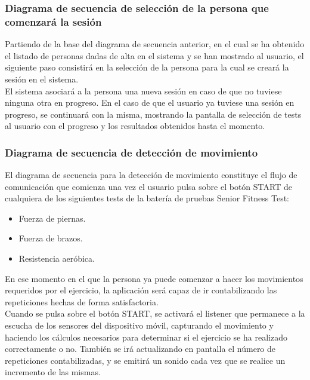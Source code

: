 \subsubsection{Diagrama de secuencia de selección de la persona que comenzará la sesión}

Partiendo de la base del diagrama de secuencia anterior, en el cual se ha obtenido el listado de personas dadas de alta en el sistema y se han mostrado al usuario, el siguiente paso consistirá en la selección de la persona para la cual se creará la sesión en el sistema.\\

El sistema asociará a la persona una nueva sesión en caso de que no tuviese ninguna otra en progreso. En el caso de que el usuario ya tuviese una sesión en progreso, se continuará con la misma, mostrando la pantalla de selección de tests al usuario con el progreso y los resultados obtenidos hasta el momento.\\


\subsubsection{Diagrama de secuencia de detección de movimiento}

El diagrama de secuencia para la detección de movimiento constituye el flujo de comunicación que comienza una vez el usuario pulsa sobre el botón START de cualquiera de los siguientes tests de la batería de pruebas Senior Fitness Test:

\begin{itemize}
\item Fuerza de piernas.
\item Fuerza de brazos.
\item Resistencia aeróbica.
\end{itemize}

En ese momento en el que la persona ya puede comenzar a hacer los movimientos requeridos por el ejercicio, la aplicación será capaz de ir contabilizando las repeticiones hechas de forma satisfactoria.\\

Cuando se pulsa sobre el botón START, se activará el listener que permanece a la escucha de los sensores del dispositivo móvil, capturando el movimiento y haciendo los cálculos necesarios para determinar si el ejercicio se ha realizado correctamente o no. También se irá actualizando en pantalla el número de repeticiones contabilizadas, y se emitirá un sonido cada vez que se realice un incremento de las mismas.\\

